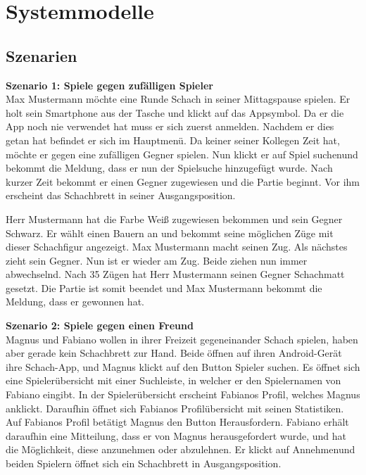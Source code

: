 \documentclass[parskip=full]{scrartcl}
\begin{document}
\section{Systemmodelle}
\subsection{Szenarien}
\textbf{Szenario 1: \glqq Spiele gegen zufälligen Spieler\grqq} \\
Max Mustermann möchte eine Runde Schach in seiner Mittagspause spielen. Er holt sein Smartphone aus der Tasche und klickt auf das Appsymbol.
Da er die App noch nie verwendet hat muss er sich zuerst anmelden. Nachdem er dies getan hat befindet er sich im Hauptmenü.
Da keiner seiner Kollegen Zeit hat, möchte er gegen eine zufälligen Gegner spielen. Nun klickt er auf \glqq Spiel suchen\grqq und bekommt die Meldung, dass er nun der Spielsuche hinzugefügt wurde.
Nach kurzer Zeit bekommt er einen Gegner zugewiesen und die Partie beginnt. Vor ihm erscheint das \gls{Schachbrett} in seiner \gls{Ausgangsposition}.

Herr Mustermann hat die Farbe Weiß zugewiesen bekommen und sein Gegner Schwarz. Er wählt einen Bauern an und bekommt seine möglichen Züge mit dieser \gls{Schachfigur} angezeigt.
Max Mustermann macht seinen Zug. Als nächstes zieht sein Gegner. Nun ist er wieder am Zug. Beide ziehen nun immer abwechselnd. Nach 35 Zügen hat Herr Mustermann
seinen Gegner \gls{Schachmatt} gesetzt. Die Partie ist somit beendet und Max Mustermann bekommt die Meldung, dass er gewonnen hat.

\textbf{Szenario 2: \glqq Spiele gegen einen Freund\grqq} \\
Magnus und Fabiano wollen in ihrer Freizeit gegeneinander Schach spielen, haben aber gerade kein Schachbrett zur Hand. Beide öffnen auf ihren \gls{Android}-Gerät ihre Schach-App, und Magnus klickt auf den Button \glqq Spieler suchen\grqq. Es öffnet sich eine Spielerübersicht mit einer Suchleiste, in welcher er den Spielernamen von Fabiano eingibt. In der Spielerübersicht erscheint Fabianos Profil, welches Magnus anklickt. Daraufhin öffnet sich Fabianos Profilübersicht mit seinen Statistiken. Auf Fabianos Profil betätigt Magnus den Button \glqq Herausfordern\grqq. Fabiano erhält daraufhin eine Mitteilung, dass er von Magnus herausgefordert wurde, und hat die Möglichkeit, diese anzunehmen oder abzulehnen. Er klickt auf \glqq Annehmen\grqq und beiden Spielern öffnet sich ein \gls{Schachbrett} in \gls{Ausgangsposition}.
\end{document}
